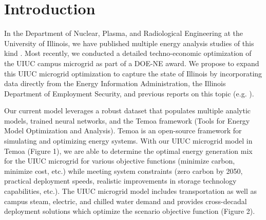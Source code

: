 \section{Introduction}
In the Department of Nuclear, Plasma, and Radiological Engineering at the 
University of Illinois, we have published multiple energy analysis studies of 
this kind \cite{stuff}. Most recently, we conducted a detailed techno-economic 
optimization of the UIUC campus microgrid as part of a DOE-NE award. We propose 
to expand this UIUC microgrid optimization to capture the state of Illinois by 
incorporating data directly from the Energy Information Administration, the 
Illinois Department of Employment Security, and previous reports on this topic 
(e.g. \cite{stuff}).

Our current model leverages a robust dataset that populates multiple analytic 
models, trained neural networks, and  the Temoa framework (Tools for Energy 
Model Optimization and Analysis). Temoa is an open-source framework for 
simulating and optimizing energy systems. With our UIUC microgrid model in 
Temoa (Figure 1), we are able to determine the optimal energy generation mix 
for the UIUC microgrid for various objective functions (minimize carbon, 
minimize cost, etc.) while meeting system constraints (zero carbon by 2050, 
practical deployment speeds, realistic improvements in storage technology 
capabilities, etc.). The UIUC microgrid model includes transportation as well 
as campus steam, electric, and chilled water demand and provides cross-decadal 
deployment solutions which optimize the scenario objective function (Figure 2).


